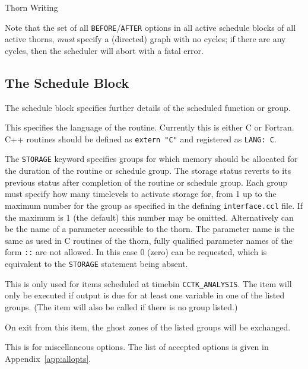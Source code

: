 \begin{cactuspart}{Thorn Writing}
\begin{Lentry}
Note that the set of all \texttt{BEFORE}/\texttt{AFTER} options in
all active schedule blocks of all active thorns, \emph{must} specify
a (directed) graph with no cycles; if there are any cycles, then the
scheduler will abort with a fatal error.
\end{Lentry}


\subsection{The Schedule Block}
\label{scheduling:schedule_block}

The schedule block specifies further details of the scheduled function
or group.

\begin{Lentry}
\item[\texttt{LANG}]
This specifies the language of the routine.  Currently this is either
C or Fortran. C++ routines should be defined as \texttt{extern "C"}
and registered as \texttt{LANG: C}.
\item[\texttt{STORAGE}] The \texttt{STORAGE} keyword specifies groups for
which memory should be allocated for the duration of the routine or
schedule group.  The storage status reverts to its previous status
after completion of the routine or schedule group.
Each group must specify how many timelevels to activate storage for,
from 1 up to the maximum number for the group as specified in the
defining {\tt interface.ccl} file. If the maximum is 1 (the default)
this number may be omitted. Alternatively  can be the
name of a parameter accessible to the thorn. The parameter name is the
same as used in C routines of the thorn, fully qualified parameter names
of the form \texttt{::} are not allowed. In this
case 0 (zero)  can be requested, which is equivalent to
the {\tt STORAGE} statement being absent.

\item[\texttt{TRIGGER}]
This is only used for items scheduled at timebin \texttt{CCTK\_ANALYSIS}.
The item will only be executed if output is due for at least one
variable in one of the listed groups.  (The item will also be called
if there is no group listed.)
\item[\texttt{SYNC}]
On exit from this item, the ghost zones of the listed groups will be
exchanged.
\item[\texttt{OPTIONS}]
This is for miscellaneous options.  The list of accepted options is
given in Appendix~\ref{app:allopts}.
\end{Lentry}


\end{cactuspart}
